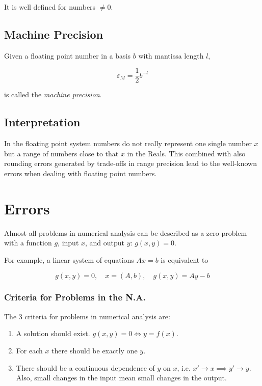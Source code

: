 It is well defined for numbers \(\ne 0\).

\subsection{Machine Precision}

Given a floating point number in a basis \(b\) with mantissa length \(l\), 

\[
    \varepsilon_M = \frac{1}{2} b^{-l}
\]

is called the \emph{machine precision}.

\subsection{Interpretation}

In the floating point system numbers do not really represent one single number \(x\) but a range 
of numbers close to that \(x\) in the Reals. This combined with also rounding errors generated by trade-offs in range 
precision lead to the well-known errors when dealing with floating point numbers.

\section{Errors}

Almost all problems in numerical analysis can be described as a zero problem with a function \(g\), 
input \(x\), and output \(y\): \(g(x, y) = 0\).

For example, a linear system of equations \(Ax = b\) is equivalent to 

\[
    g(x, y) = 0, \quad x = (A, b), \quad g(x, y) = Ay - b
\]

\subsubsection{Criteria for Problems in the N.A.}

The 3 criteria for problems in numerical analysis are: 

\begin{enumerate}

    \item A solution should exist. \(g(x, y) = 0 \iff y = f(x)\).
  
    \item For each \(x\) there should be exactly one \(y\). 
   
    \item There should be a continuous dependence of \(y\) on \(x\), i.e. \(x' \to x \implies y' \to y\). Also, 
    small changes in the input mean small changes in the output. 
    
\end{enumerate}

